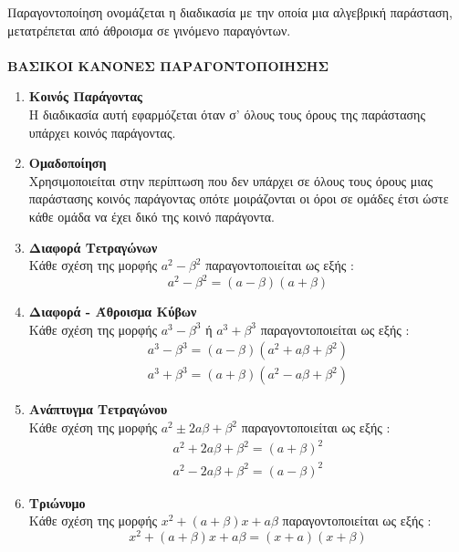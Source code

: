 \documentclass[twoside,nofonts,internet,shmeiwseis]{thewria}
\begin{document}
\orismoi
{}
Παραγοντοποίηση ονομάζεται η διαδικασία με την οποία μια αλγεβρική παράσταση, μετατρέπεται από άθροισμα σε γινόμενο παραγόντων.\\\\
\textbf{ΒΑΣΙΚΟΙ ΚΑΝΟΝΕΣ ΠΑΡΑΓΟΝΤΟΠΟΙΗΣΗΣ}
\begin{enumerate}[itemsep=0mm,label=\bf\arabic*.]
\item \textbf{Κοινός Παράγοντας}\\
Η διαδικασία αυτή εφαρμόζεται όταν σ' όλους τους όρους της παράστασης υπάρχει κοινός παράγοντας.
\item \textbf{Ομαδοποίηση}\\
Χρησιμοποιείται στην περίπτωση που δεν υπάρχει σε όλους τους όρους μιας παράστασης κοινός παράγοντας οπότε μοιράζονται οι όροι σε ομάδες έτσι ώστε κάθε ομάδα να έχει δικό της κοινό παράγοντα.
\item \textbf{Διαφορά Τετραγώνων}\\
Κάθε σχέση της μορφής $ a^2-\beta^2 $ παραγοντοποιείται ως εξής : \[ a^2-\beta^2=(a-\beta)(a+\beta) \]
\item \textbf{Διαφορά - Άθροισμα Κύβων}\\
Κάθε σχέση της μορφής $ a^3-\beta^3 $ ή $ a^3+\beta^3 $ παραγοντοποιείται ως εξής : \begin{gather*}
a^3-\beta^3=(a-\beta)\left(a^2+a\beta+\beta^2 \right)\\
a^3+\beta^3=(a+\beta)\left(a^2-a\beta+\beta^2 \right)
\end{gather*}
\item \textbf{Ανάπτυγμα Τετραγώνου}\\
Κάθε σχέση της μορφής $ a^2\pm2a\beta+\beta^2 $ παραγοντοποιείται ως εξής :
\begin{gather*}
a^2+2a\beta+\beta^2=(a+\beta)^2\\
a^2-2a\beta+\beta^2=(a-\beta)^2
\end{gather*}
\item \textbf{Τριώνυμο}\\
Κάθε σχέση της μορφής $ x^2+(a+\beta)x+a\beta $ παραγοντοποιείται ως εξής : \[ x^2+(a+\beta)x+a\beta=(x+a)(x+\beta) \]
\end{enumerate}
\end{document}

